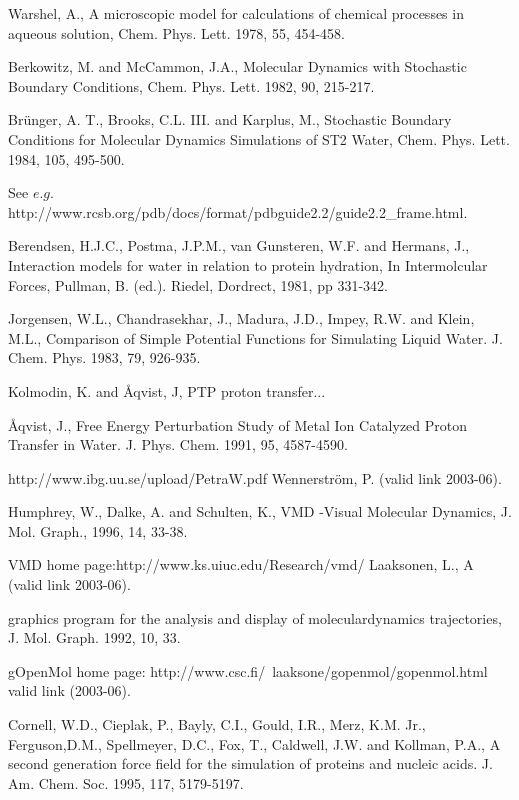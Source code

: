\documentclass[a4paper,10pt]{article}
\begin{document}
\begin{thebibliography}{2}
Warshel, A., A microscopic
model for calculations of chemical processes in aqueous solution,
Chem. Phys. Lett. 1978, 55, 454-458.

Berkowitz, M. and McCammon, J.A., Molecular Dynamics with Stochastic Boundary Conditions,
Chem. Phys. Lett. 1982, 90, 215-217.

Br{\"u}nger, A. T., Brooks, C.L. III. and Karplus, M., Stochastic Boundary Conditions for
Molecular Dynamics Simulations of ST2 Water, Chem. Phys. Lett.
1984, 105, 495-500.

See $e.g.$ http://www.rcsb.org/pdb/docs/format/pdbguide2.2/guide2.2\_frame.html.

Berendsen, H.J.C., Postma, J.P.M., van Gunsteren, W.F. and Hermans, J., Interaction
models for water in relation to protein hydration, In
Intermolcular Forces, Pullman, B. (ed.). Riedel, Dordrect, 1981,
pp 331-342.

Jorgensen, W.L., Chandrasekhar, J., Madura, J.D., Impey, R.W. and Klein, M.L., Comparison
of Simple Potential Functions for Simulating Liquid Water. J.
Chem. Phys. 1983, 79, 926-935.

Kolmodin, K. and \AA qvist, J, PTP proton transfer...

\AA qvist, J., Free Energy Perturbation Study of Metal Ion Catalyzed Proton Transfer in Water. J. Phys. Chem. 1991, 95,
4587-4590.

 http://www.ibg.uu.se/upload/PetraW.pdf Wennerstr{\"o}m, P. (valid link
2003-06).

 Humphrey, W., Dalke, A. and Schulten, K., VMD -Visual Molecular Dynamics, J. Mol. Graph., 1996, 14,
33-38.

 VMD home page:http://www.ks.uiuc.edu/Research/vmd/ Laaksonen, L., A (valid link
2003-06).

 graphics program for the analysis and display of moleculardynamics trajectories, J. Mol. Graph. 1992, 10, 33.

 gOpenMol home page: http://www.csc.fi/~laaksone/gopenmol/gopenmol.html valid link (2003-06).

 Cornell, W.D., Cieplak, P., Bayly, C.I., Gould, I.R., Merz, K.M. Jr., Ferguson,D.M., Spellmeyer, D.C., Fox, T., Caldwell, J.W. and Kollman, P.A., A second generation force field for the simulation of proteins and nucleic acids. J. Am. Chem. Soc. 1995, 117,
5179-5197.


\end{thebibliography}
\end{document}
